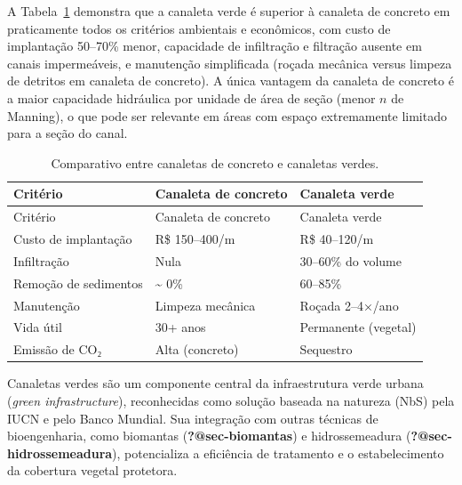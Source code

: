\documentclass[
  portuguese,
  11pt,
  a4paper,
  open=any]{scrbook}
\begin{document}
A Tabela~\ref{tbl-comparativo} demonstra que a canaleta verde é superior
à canaleta de concreto em praticamente todos os critérios ambientais e
econômicos, com custo de implantação 50--70\% menor, capacidade de
infiltração e filtração ausente em canais impermeáveis, e manutenção
simplificada (roçada mecânica versus limpeza de detritos em canaleta de
concreto). A única vantagem da canaleta de concreto é a maior capacidade
hidráulica por unidade de área de seção (menor \(n\) de Manning), o que
pode ser relevante em áreas com espaço extremamente limitado para a
seção do canal.

\begin{longtable}[]{@{}lll@{}}
\caption{Comparativo entre canaletas de concreto e canaletas
verdes.}\label{tbl-comparativo}\tabularnewline
\toprule\noalign{}
Critério & Canaleta de concreto & Canaleta verde \\
\midrule\noalign{}
\endfirsthead
\toprule\noalign{}
Critério & Canaleta de concreto & Canaleta verde \\
\midrule\noalign{}
\endhead
\bottomrule\noalign{}
\endlastfoot
Custo de implantação & R\$ 150--400/m & R\$ 40--120/m \\
Infiltração & Nula & 30--60\% do volume \\
Remoção de sedimentos & \textasciitilde{} 0\% & 60--85\% \\
Manutenção & Limpeza mecânica & Roçada 2--4×/ano \\
Vida útil & 30+ anos & Permanente (vegetal) \\
Emissão de CO₂ & Alta (concreto) & Sequestro \\
\end{longtable}

\begin{tcolorbox}[enhanced jigsaw, leftrule=.75mm, colframe=quarto-callout-tip-color-frame, colback=white, bottomrule=.15mm, opacityback=0, colbacktitle=quarto-callout-tip-color!10!white, breakable, bottomtitle=1mm, opacitybacktitle=0.6, title=\textcolor{quarto-callout-tip-color}{\faLightbulb}\hspace{0.5em}{Infraestrutura verde}, titlerule=0mm, toprule=.15mm, toptitle=1mm, rightrule=.15mm, left=2mm, arc=.35mm, coltitle=black]

Canaletas verdes são um componente central da infraestrutura verde
urbana (\emph{green infrastructure}), reconhecidas como solução baseada
na natureza (NbS) pela IUCN e pelo Banco Mundial. Sua integração com
outras técnicas de bioengenharia, como biomantas
(\textbf{?@sec-biomantas}) e hidrossemeadura
(\textbf{?@sec-hidrossemeadura}), potencializa a eficiência de
tratamento e o estabelecimento da cobertura vegetal protetora.

\end{tcolorbox}
\end{document}
